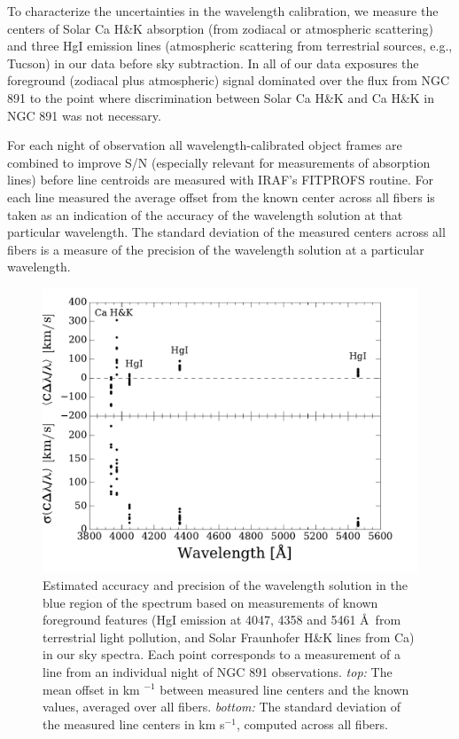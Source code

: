 To characterize the uncertainties in the wavelength calibration, we
measure the centers of Solar Ca H\&K absorption (from zodiacal or
atmospheric scattering) and three HgI emission lines (atmospheric
scattering from terrestrial sources, e.g., Tucson) in our data before
sky subtraction. In all of our data exposures the foreground (zodiacal
plus atmospheric) signal dominated over the flux from NGC 891 to the
point where discrimination between Solar Ca H\&K and Ca H\&K in NGC
891 was not necessary.

For each night of observation all wavelength-calibrated object frames
are combined to improve S/N (especially relevant for measurements of
absorption lines) before line centroids are measured with IRAF's
FITPROFS routine. For each line measured the average offset from the
known center across all \GP fibers is taken as an indication of the
accuracy of the wavelength solution at that particular wavelength. The
standard deviation of the measured centers across all \GP fibers is a
measure of the precision of the wavelength solution at a particular
wavelength.

\begin{figure}
  \centering
  \includegraphics[width=\columnwidth]{891_1/figs/Wave_Err_comb.pdf}
  \caption[Accuracy and precision of wavelength
  calibration]{\label{891_1:fig:wave_err}\fixspacing Estimated accuracy and
    precision of the wavelength solution in the blue region of the
    spectrum based on measurements of known foreground features (HgI
    emission at 4047, 4358 and 5461 \AA\ from terrestrial light
    pollution, and Solar Fraunhofer H\&K lines from Ca) in our sky
    spectra.  Each point corresponds to a measurement of a line from
    an individual night of NGC 891 observations. \emph{top:} The mean
    offset in km $^{-1}$ between measured line centers and the known
    values, averaged over all \GP fibers. \emph{bottom:} The standard
    deviation of the measured line centers in km s$^{-1}$, computed
    across all \GP fibers.}
\end{figure}

